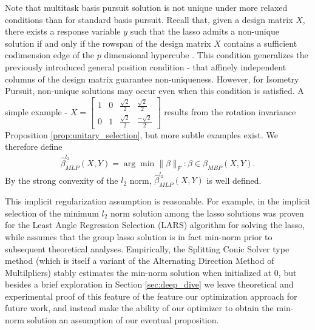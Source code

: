 Note that multitask basis pursuit solution is not unique under more relaxed conditions than for standard basis pursuit.
Recall that, given a design matrix $X$, there exists a response variable $y$ such that the lasso admits a non-unique solution if and only if the rowspan of the design matrix $X$ contains a sufficient codimension edge of the $p$ dimensional hypercube \citep{Schneider2022-hi}.
This condition generalizes the previously introduced general position condition - that affinely independent columns of the design matrix guarantee non-uniqueness.
However, for Isometry Pursuit, non-unique solutions may occur even when this condition is satisfied.
A simple example -
$X =
\begin{bmatrix}
1 & 0 & \frac{\sqrt{2}}{2} & \frac{\sqrt{2}}{2}  \\
0 & 1 & \frac{\sqrt{2}}{2} & \frac{-\sqrt{2}}{2}  
\end{bmatrix}$
results from the rotation invariance Proposition \ref{prop:unitary_selection}, but more subtle examples exist.
We therefore define
\begin{align}
\widehat \beta^{l_2}_{MLP} (X,Y) = \arg \min \|\beta\|_F : \beta \in \mathcal \beta_{MBP} (X, Y) .
\end{align}
By the strong convexity of the $l_2$ norm, $\widehat \beta^{l_2}_{MLP} (X,Y)$ is well defined.

This implicit regularization assumption is reasonable.
For example, in \citet{Tibshirani2012-vw} the implicit selection of the minimum $l_2$ norm solution among the lasso solutions was proven for the Least Angle Regression Selection (LARS) algorithm for solving the lasso, while \citet{Mishkin2022-yf}  assumes that the group lasso solution is in fact min-norm prior to subsequent theoretical analyses.
Empirically, the Splitting Conic Solver type method (which is itself a variant of the Alternating Direction Method of Multilpliers) \citep{O-Donoghue2013-wf} stably estimates the min-norm solution when initialized at $0$, but besides a brief exploration in Section \ref{sec:deep_dive} we leave theoretical and experimental proof of this feature of the feature our optimization approach for future work, and instead make the ability of our optimizer to obtain the min-norm solution an assumption of our eventual proposition.

